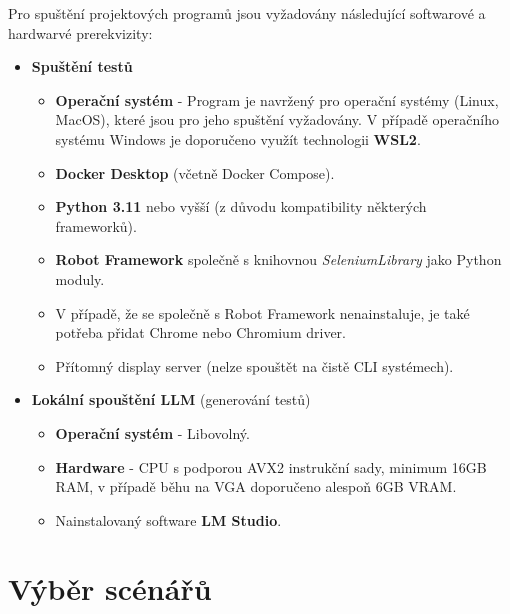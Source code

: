 \documentclass[czech, ma, kiv, he, iso690alph, pdf, viewonly]{fasthesis}
\begin{document}
    Pro spuštění projektových programů jsou vyžadovány následující softwarové a hardwarvé prerekvizity:
    \begin{itemize}
        \item\textbf{Spuštění testů}
           \begin{itemize}
                \item \textbf{Operační systém} - Program je navržený pro  operační systémy (Linux, MacOS), které jsou pro jeho spuštění vyžadovány. V případě operačního systému Windows je doporučeno využít technologii \textbf{WSL2}.
                \item \textbf{Docker Desktop} (včetně Docker Compose).
                \item \textbf{Python 3.11} nebo vyšší (z důvodu kompatibility některých frameworků).
                \item \textbf{Robot Framework} společně s knihovnou \textit{SeleniumLibrary} jako Python moduly.
                \item V případě, že se společně s Robot Framework nenainstaluje, je také potřeba přidat Chrome nebo Chromium driver.
                \item Přítomný display server (nelze spouštět na čistě CLI systémech).
           \end{itemize} 
       \item\textbf{Lokální spouštění LLM} (generování testů)
           \begin{itemize}
                \item \textbf{Operační systém} - Libovolný.
                \item \textbf{Hardware} - CPU s podporou AVX2 instrukční sady, minimum 16GB RAM, v případě běhu na VGA doporučeno alespoň 6GB VRAM.
                \item Nainstalovaný software \textbf{LM Studio}.
           \end{itemize}
    \end{itemize}

    \section{Výběr scénářů} \label{sec:scenarios}
\end{document}
